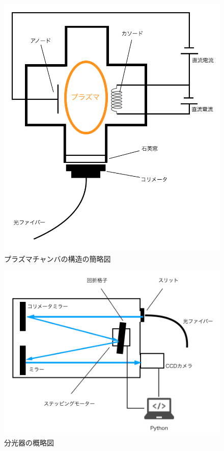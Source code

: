 \begin{figure}
    \centering
    \includegraphics[width=15cm]{pictures/chamber-simple.png}
    \caption{プラズマチャンバの構造の簡略図}
    \label{fig:chamber-simple}
\end{figure}

\begin{figure}
    \centering
    \includegraphics[width=15cm]{pictures/spectrometer-picture.png}
    \caption{分光器の概略図}
    \label{fig:spectrometer-picture}
\end{figure}

